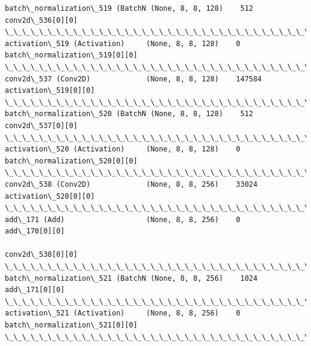 \documentclass[11pt]{article}
\begin{document}
\begin{Verbatim}[commandchars=\\\{\}]
batch\_normalization\_519 (BatchN (None, 8, 8, 128)    512         conv2d\_536[0][0]                 
\_\_\_\_\_\_\_\_\_\_\_\_\_\_\_\_\_\_\_\_\_\_\_\_\_\_\_\_\_\_\_\_\_\_\_\_\_\_\_\_\_\_\_\_\_\_\_\_\_\_\_\_\_\_\_\_\_\_\_\_\_\_\_\_\_\_\_\_\_\_\_\_\_\_\_\_\_\_\_\_\_\_\_\_\_\_\_\_\_\_\_\_\_\_\_\_\_\_
activation\_519 (Activation)     (None, 8, 8, 128)    0           batch\_normalization\_519[0][0]    
\_\_\_\_\_\_\_\_\_\_\_\_\_\_\_\_\_\_\_\_\_\_\_\_\_\_\_\_\_\_\_\_\_\_\_\_\_\_\_\_\_\_\_\_\_\_\_\_\_\_\_\_\_\_\_\_\_\_\_\_\_\_\_\_\_\_\_\_\_\_\_\_\_\_\_\_\_\_\_\_\_\_\_\_\_\_\_\_\_\_\_\_\_\_\_\_\_\_
conv2d\_537 (Conv2D)             (None, 8, 8, 128)    147584      activation\_519[0][0]             
\_\_\_\_\_\_\_\_\_\_\_\_\_\_\_\_\_\_\_\_\_\_\_\_\_\_\_\_\_\_\_\_\_\_\_\_\_\_\_\_\_\_\_\_\_\_\_\_\_\_\_\_\_\_\_\_\_\_\_\_\_\_\_\_\_\_\_\_\_\_\_\_\_\_\_\_\_\_\_\_\_\_\_\_\_\_\_\_\_\_\_\_\_\_\_\_\_\_
batch\_normalization\_520 (BatchN (None, 8, 8, 128)    512         conv2d\_537[0][0]                 
\_\_\_\_\_\_\_\_\_\_\_\_\_\_\_\_\_\_\_\_\_\_\_\_\_\_\_\_\_\_\_\_\_\_\_\_\_\_\_\_\_\_\_\_\_\_\_\_\_\_\_\_\_\_\_\_\_\_\_\_\_\_\_\_\_\_\_\_\_\_\_\_\_\_\_\_\_\_\_\_\_\_\_\_\_\_\_\_\_\_\_\_\_\_\_\_\_\_
activation\_520 (Activation)     (None, 8, 8, 128)    0           batch\_normalization\_520[0][0]    
\_\_\_\_\_\_\_\_\_\_\_\_\_\_\_\_\_\_\_\_\_\_\_\_\_\_\_\_\_\_\_\_\_\_\_\_\_\_\_\_\_\_\_\_\_\_\_\_\_\_\_\_\_\_\_\_\_\_\_\_\_\_\_\_\_\_\_\_\_\_\_\_\_\_\_\_\_\_\_\_\_\_\_\_\_\_\_\_\_\_\_\_\_\_\_\_\_\_
conv2d\_538 (Conv2D)             (None, 8, 8, 256)    33024       activation\_520[0][0]             
\_\_\_\_\_\_\_\_\_\_\_\_\_\_\_\_\_\_\_\_\_\_\_\_\_\_\_\_\_\_\_\_\_\_\_\_\_\_\_\_\_\_\_\_\_\_\_\_\_\_\_\_\_\_\_\_\_\_\_\_\_\_\_\_\_\_\_\_\_\_\_\_\_\_\_\_\_\_\_\_\_\_\_\_\_\_\_\_\_\_\_\_\_\_\_\_\_\_
add\_171 (Add)                   (None, 8, 8, 256)    0           add\_170[0][0]                    
                                                                 conv2d\_538[0][0]                 
\_\_\_\_\_\_\_\_\_\_\_\_\_\_\_\_\_\_\_\_\_\_\_\_\_\_\_\_\_\_\_\_\_\_\_\_\_\_\_\_\_\_\_\_\_\_\_\_\_\_\_\_\_\_\_\_\_\_\_\_\_\_\_\_\_\_\_\_\_\_\_\_\_\_\_\_\_\_\_\_\_\_\_\_\_\_\_\_\_\_\_\_\_\_\_\_\_\_
batch\_normalization\_521 (BatchN (None, 8, 8, 256)    1024        add\_171[0][0]                    
\_\_\_\_\_\_\_\_\_\_\_\_\_\_\_\_\_\_\_\_\_\_\_\_\_\_\_\_\_\_\_\_\_\_\_\_\_\_\_\_\_\_\_\_\_\_\_\_\_\_\_\_\_\_\_\_\_\_\_\_\_\_\_\_\_\_\_\_\_\_\_\_\_\_\_\_\_\_\_\_\_\_\_\_\_\_\_\_\_\_\_\_\_\_\_\_\_\_
activation\_521 (Activation)     (None, 8, 8, 256)    0           batch\_normalization\_521[0][0]    
\_\_\_\_\_\_\_\_\_\_\_\_\_\_\_\_\_\_\_\_\_\_\_\_\_\_\_\_\_\_\_\_\_\_\_\_\_\_\_\_\_\_\_\_\_\_\_\_\_\_\_\_\_\_\_\_\_\_\_\_\_\_\_\_\_\_\_\_\_\_\_\_\_\_\_\_\_\_\_\_\_\_\_\_\_\_\_\_\_\_\_\_\_\_\_\_\_\_

\end{Verbatim}
\end{document}
